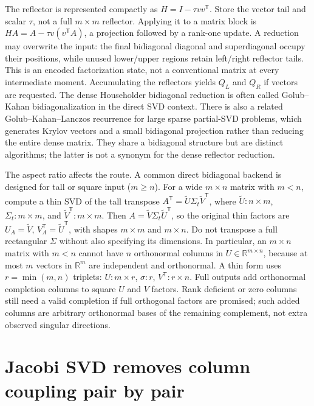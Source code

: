 The reflector is represented compactly as \(H=I-\tau vv^\mathsf T\). Store the vector tail and scalar \(\tau\), not a full \(m\times m\) reflector. Applying it to a matrix block is \(HA=A-\tau v(v^\mathsf TA)\), a projection followed by a rank-one update. A reduction may overwrite the input: the final bidiagonal diagonal and superdiagonal occupy their positions, while unused lower/upper regions retain left/right reflector tails. This is an encoded factorization state, not a conventional matrix at every intermediate moment. Accumulating the reflectors yields \(Q_L\) and \(Q_R\) if vectors are requested. The dense Householder bidiagonal reduction is often called Golub--Kahan bidiagonalization in the direct SVD context. There is also a related Golub--Kahan--Lanczos recurrence for large sparse partial-SVD problems, which generates Krylov vectors and a small bidiagonal projection rather than reducing the entire dense matrix. They share a bidiagonal structure but are distinct algorithms; the latter is not a synonym for the dense reflector reduction.

The aspect ratio affects the route. A common direct bidiagonal backend is designed for tall or square input (\(m\ge n\)). For a wide \(m\times n\) matrix with \(m<n\), compute a thin SVD of the tall transpose \(A^\mathsf T=\tilde U\Sigma_t\tilde V^\mathsf T\), where \(\tilde U:n\times m\), \(\Sigma_t:m\times m\), and \(\tilde V^\mathsf T:m\times m\). Then \(A=\tilde V\Sigma_t\tilde U^\mathsf T\), so the original thin factors are \(U_A=\tilde V\), \(V_A^\mathsf T=\tilde U^\mathsf T\), with shapes \(m\times m\) and \(m\times n\). Do not transpose a full rectangular \(\Sigma\) without also specifying its dimensions. In particular, an \(m\times n\) matrix with \(m<n\) cannot have \(n\) orthonormal columns in \(U\in\mathbb R^{m\times n}\), because at most \(m\) vectors in \(\mathbb R^m\) are independent and orthonormal. A thin form uses \(r=\min(m,n)\) triplets: \(U:m\times r\), \(\sigma:r\), \(V^\mathsf T:r\times n\). Full outputs add orthonormal completion columns to square \(U\) and \(V\) factors. Rank deficient or zero columns still need a valid completion if full orthogonal factors are promised; such added columns are arbitrary orthonormal bases of the remaining complement, not extra observed singular directions.

\section{Jacobi SVD removes column coupling pair by pair}\label{02-foundations-ii-ch038-jacobi-svd-removes-column-coupling-pair-by-pair}

